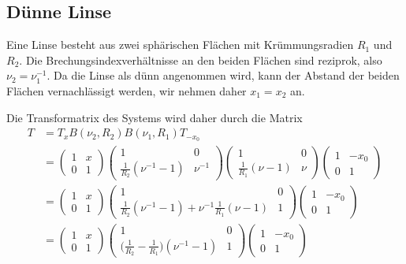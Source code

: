 %
%
%
\subsection{Dünne Linse\label{mo:subsection:linse}}
Eine Linse besteht aus zwei sphärischen Flächen mit 
Krümmungsradien $R_1$ und $R_2$.
Die Brechungsindexverhältnisse an den beiden Flächen sind reziprok,
also $\nu_2=\nu_1^{-1}$.
Da die Linse als dünn angenommen wird, kann der Abstand der beiden Flächen
vernachlässigt werden, wir nehmen daher $x_1=x_2$ an.

Die Transformatrix des Systems wird daher durch die Matrix
\begin{align*}
T
&=
T_x
B(\nu_2, R_2)
B(\nu_1, R_1)
T_{-x_0}
\\
&=
\begin{pmatrix}
1&x\\
0&1
\end{pmatrix}
\begin{pmatrix}
1&0\\
\frac1{R_2}(\nu^{-1}-1)&\nu^{-1}
\end{pmatrix}
\begin{pmatrix}
1&0\\
\frac1{R_1}(\nu-1)&\nu
\end{pmatrix}
\begin{pmatrix}
1&-x_0\\
0&1
\end{pmatrix}
\\
&=
\begin{pmatrix}
1&x\\
0&1
\end{pmatrix}
\begin{pmatrix}
1&0\\
\frac1{R_2}(\nu^{-1}-1)+\nu^{-1}\frac{1}{R_1}(\nu-1)&1
\end{pmatrix}
\begin{pmatrix}
1&-x_0\\
0&1
\end{pmatrix}
\\
&=
\begin{pmatrix}
1&x\\
0&1
\end{pmatrix}
\begin{pmatrix}
1&0\\
\displaystyle
\biggl(\frac1{R_2}-\frac1{R_1}\biggr)(\nu^{-1}-1)
&1
\end{pmatrix}
\begin{pmatrix}
1&-x_0\\
0&1
\end{pmatrix}
\end{align*}

